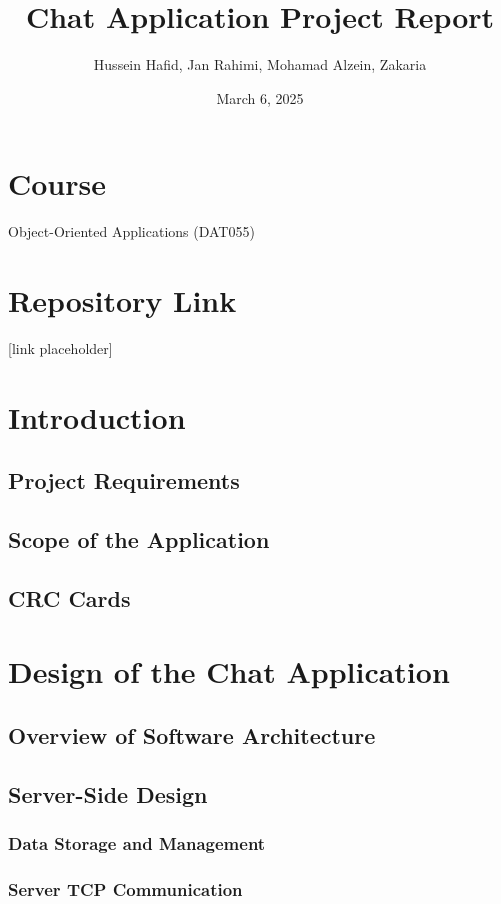 \documentclass[a4paper,11pt]{article}
\title{Chat Application Project Report}
\author{Hussein Hafid, Jan Rahimi, Mohamad Alzein, Zakaria}
\date{March 6, 2025}
\begin{document}
\justifying
{}

\maketitle

\section*{Course}
Object-Oriented Applications (DAT055)

\section*{Repository Link}
 [link placeholder]

\newpage
\tableofcontents
\newpage
\listoffigures
\newpage
\listoftables
\newpage

\section{Introduction}
\subsection{Project Requirements}
\subsection{Scope of the Application}
\subsection{CRC Cards}

\section{Design of the Chat Application}
\subsection{Overview of Software Architecture}
\subsection{Server-Side Design}
\subsubsection{Data Storage and Management}
\subsubsection{Server TCP Communication}
\end{document}
